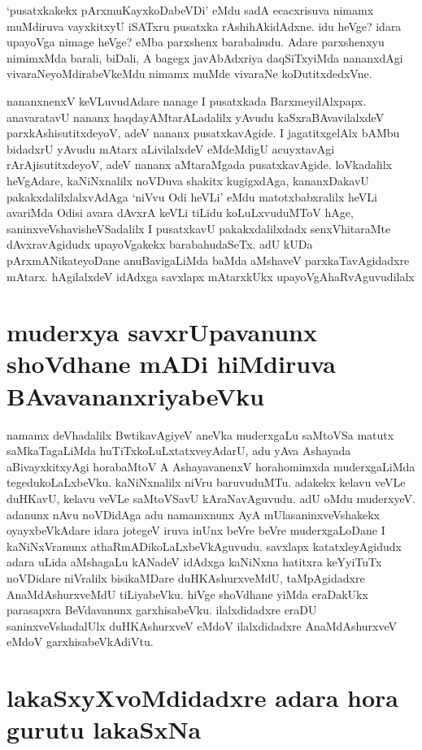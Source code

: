`pusatxkakekx  pArxmuKayxkoDabeVDi' eMdu sadA ecacxrisuva nimamx muMdiruva vayxkitxyU iSATxru pusatxka rAshihAkidAdxne. idu heVge? idara upayoVga nimage heVge? eMba parxshenx barabahudu. Adare parxshenxyu nimimxMda barali, biDali, A bagegx javAbAdxriya daqSiTxyiMda nananxdAgi vivaraNeyoMdirabeVkeMdu nimamx muMde vivaraNe koDutitxdedxVne.

nananxnenxV keVLuvudAdare nanage I pusatxkada BarxmeyilAlxpapx. anavaratavU nananx haqdayAMtarALadalilx yAvudu kaSxraBAvavilalxdeV parxkAshisutitxdeyoV, adeV nananx pusatxkavAgide. I jagatitxgelAlx bAMbu bidadxrU yAvudu mAtarx aLivilalxdeV eMdeMdigU acuyxtavAgi rArAjisutitxdeyoV, adeV nananx aMtaraMgada pusatxkavAgide. loVkadalilx heVgAdare, kaNiNxnalilx noVDuva shakitx kugigxdAga, kananxDakavU pakakxdalilxlalxvAdAga `niVvu Odi heVLi' eMdu matotxbabxralilx heVLi avariMda Odisi avara dAvxrA keVLi tiLidu koLuLxvuduMToV hAge, saninxveVshavisheVSadalilx I pusatxkavU pakakxdalilxdadx senxVhitaraMte dAvxravAgidudx upayoVgakekx barabahudaSeTx. adU kUDa pArxmANikateyoDane anuBavigaLiMda baMda aMshaveV parxkaTavAgidadxre mAtarx. hAgilalxdeV idAdxga savxlapx mAtarxkUkx upayoVgAhaRvAguvudilalx

\section*{muderxya savxrUpavanunx shoVdhane mADi hiMdiruva BAvavananxriyabeVku}

namamx deVhadalilx BwtikavAgiyeV aneVka muderxgaLu saMtoVSa matutx saMkaTagaLiMda huTiTxkoLuLxtatxveyAdarU, adu yAva Ashayada aBivayxkitxyAgi horabaMtoV A AshayavanenxV horahomimxda muderxgaLiMda tegedukoLaLxbeVku. kaNiNxnalilx niVru baruvuduMTu. adakekx kelavu veVLe duHKavU, kelavu veVLe saMtoVSavU kAraNavAguvudu. adU oMdu muderxyeV. adanunx nAvu noVDidAga adu namamxnunx AyA mUlasaninxveVshakekx oyayxbeVkAdare idara jotegeV iruva inUnx beVre beVre muderxgaLoDane I kaNiNxVranunx  athaRmADikoLaLxbeVkAguvudu. savxlapx katatxleyAgidudx adara uLida aMshagaLu kANadeV idAdxga kaNiNxna hatitxra keYyiTuTx noVDidare niVralilx bisikaMDare duHKAshurxveMdU, taMpAgidadxre AnaMdAshurxveMdU tiLiyabeVku. hiVge shoVdhane yiMda eraDakUkx parasapxra BeVdavanunx garxhisabeVku. ilalxdidadxre eraDU saninxveVshadalUlx duHKAshurxveV eMdoV ilalxdidadxre AnaMdAshurxveV eMdoV garxhisabeVkAdiVtu.

\section*{lakaSxyXvoMdidadxre adara hora gurutu lakaSxNa}

